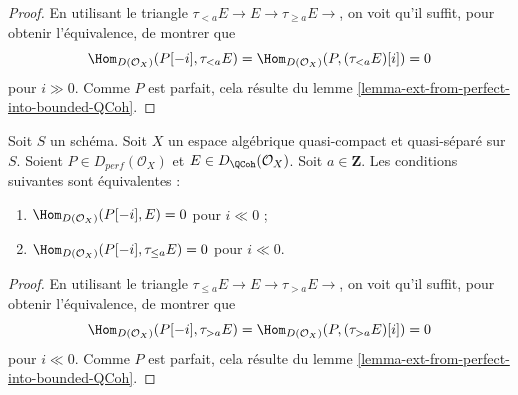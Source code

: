 \begin{proof}
En utilisant le triangle $\tau_{<a}E\to E\to\tau_{\geq a}E\to$, on voit
qu'il suffit, pour obtenir l'\'equivalence, de montrer que
$$
\Hom_{D(\mathcal{O}_X)}(P[-i], \tau_{< a} E) =
\Hom_{D(\mathcal{O}_X)}(P, (\tau_{< a} E)[i]) = 0
$$
pour $i\gg0$. Comme $P$ est parfait, cela r\'esulte du lemme
\ref{lemma-ext-from-perfect-into-bounded-QCoh}.
\end{proof}

\begin{lemma}
\label{lemma-bounded-below-truncation}
Soit $S$ un sch\'ema.
Soit $X$ un espace alg\'ebrique quasi-compact et quasi-s\'epar\'e sur $S$.
Soient $P\in D_{perf}(\mathcal{O}_X)$ et
$E\in D_{\QCoh}(\mathcal{O}_X)$. Soit $a\in\mathbf{Z}$.
Les conditions suivantes sont \'equivalentes :
\begin{enumerate}
\item $\Hom_{D(\mathcal{O}_X)}(P[-i],E)=0$ pour $i\ll0$ ;
\item $\Hom_{D(\mathcal{O}_X)}(P[-i],\tau_{\leq a}E)=0$ pour $i\ll0$.
\end{enumerate}
\end{lemma}

\begin{proof}
En utilisant le triangle $\tau_{\leq a}E\to E\to\tau_{>a}E\to$, on voit
qu'il suffit, pour obtenir l'\'equivalence, de montrer que
$$
\Hom_{D(\mathcal{O}_X)}(P[-i], \tau_{> a} E) =
\Hom_{D(\mathcal{O}_X)}(P, (\tau_{> a} E)[i]) = 0
$$
pour $i\ll0$. Comme $P$ est parfait, cela r\'esulte du lemme
\ref{lemma-ext-from-perfect-into-bounded-QCoh}.
\end{proof}

